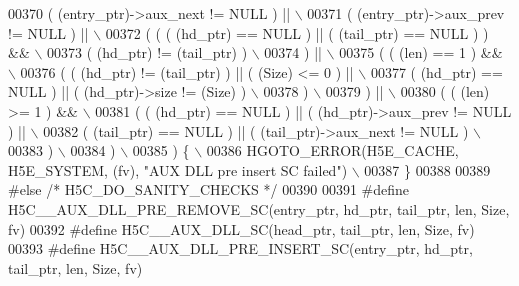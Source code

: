\begin{DoxyCode}
00370 \textcolor{preprocessor}{     ( (entry\_ptr)->aux\_next != NULL ) ||                                      \(\backslash\)}
00371 \textcolor{preprocessor}{     ( (entry\_ptr)->aux\_prev != NULL ) ||                                      \(\backslash\)}
00372 \textcolor{preprocessor}{     ( ( ( (hd\_ptr) == NULL ) || ( (tail\_ptr) == NULL ) ) &&                   \(\backslash\)}
00373 \textcolor{preprocessor}{       ( (hd\_ptr) != (tail\_ptr) )                                              \(\backslash\)}
00374 \textcolor{preprocessor}{     ) ||                                                                      \(\backslash\)}
00375 \textcolor{preprocessor}{     ( ( (len) == 1 ) &&                                                       \(\backslash\)}
00376 \textcolor{preprocessor}{       ( ( (hd\_ptr) != (tail\_ptr) ) || ( (Size) <= 0 ) ||                      \(\backslash\)}
00377 \textcolor{preprocessor}{         ( (hd\_ptr) == NULL ) || ( (hd\_ptr)->size != (Size) )                  \(\backslash\)}
00378 \textcolor{preprocessor}{       )                                                                       \(\backslash\)}
00379 \textcolor{preprocessor}{     ) ||                                                                      \(\backslash\)}
00380 \textcolor{preprocessor}{     ( ( (len) >= 1 ) &&                                                       \(\backslash\)}
00381 \textcolor{preprocessor}{       ( ( (hd\_ptr) == NULL ) || ( (hd\_ptr)->aux\_prev != NULL ) ||             \(\backslash\)}
00382 \textcolor{preprocessor}{         ( (tail\_ptr) == NULL ) || ( (tail\_ptr)->aux\_next != NULL )            \(\backslash\)}
00383 \textcolor{preprocessor}{       )                                                                       \(\backslash\)}
00384 \textcolor{preprocessor}{     )                                                                         \(\backslash\)}
00385 \textcolor{preprocessor}{   ) \{                                                                         \(\backslash\)}
00386 \textcolor{preprocessor}{    HGOTO\_ERROR(H5E\_CACHE, H5E\_SYSTEM, (fv), "AUX DLL pre insert SC failed")   \(\backslash\)}
00387 \textcolor{preprocessor}{\}}
00388 
00389 \textcolor{preprocessor}{#else }\textcolor{comment}{/* H5C\_DO\_SANITY\_CHECKS */}\textcolor{preprocessor}{}
00390 
00391 \textcolor{preprocessor}{#define H5C\_\_AUX\_DLL\_PRE\_REMOVE\_SC(entry\_ptr, hd\_ptr, tail\_ptr, len, Size, fv)}
00392 \textcolor{preprocessor}{#define H5C\_\_AUX\_DLL\_SC(head\_ptr, tail\_ptr, len, Size, fv)}
00393 \textcolor{preprocessor}{#define H5C\_\_AUX\_DLL\_PRE\_INSERT\_SC(entry\_ptr, hd\_ptr, tail\_ptr, len, Size, fv)}

\end{DoxyCode}
